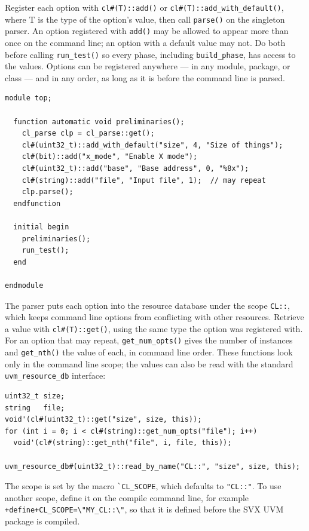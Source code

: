 \documentclass[11pt,letterpaper]{report}
\begin{document}
Register each option with \texttt{cl\#(T)::add()} or \texttt{cl\#(T)::add\_with\_default()}, where T is the type of the option's value, then call \texttt{parse()} on the singleton parser. An option registered with \texttt{add()} may be allowed to appear more than once on the command line; an option with a default value may not. Do both before calling \texttt{run\_test()} so every phase, including \texttt{build\_phase}, has access to the values. Options can be registered anywhere --- in any module, package, or class --- and in any order, as long as it is before the command line is parsed.

\begin{verbatim}
module top;

  function automatic void preliminaries();
    cl_parse clp = cl_parse::get();
    cl#(uint32_t)::add_with_default("size", 4, "Size of things");
    cl#(bit)::add("x_mode", "Enable X mode");
    cl#(uint32_t)::add("base", "Base address", 0, "%8x");
    cl#(string)::add("file", "Input file", 1);  // may repeat
    clp.parse();
  endfunction

  initial begin
    preliminaries();
    run_test();
  end

endmodule
\end{verbatim}

The parser puts each option into the resource database under the scope \texttt{CL::}, which keeps command line options from conflicting with other resources. Retrieve a value with \texttt{cl\#(T)::get()}, using the same type the option was registered with. For an option that may repeat, \texttt{get\_num\_opts()} gives the number of instances and \texttt{get\_nth()} the value of each, in command line order. These functions look only in the command line scope; the values can also be read with the standard \texttt{uvm\_resource\_db} interface:

\begin{verbatim}
uint32_t size;
string   file;
void'(cl#(uint32_t)::get("size", size, this));
for (int i = 0; i < cl#(string)::get_num_opts("file"); i++)
  void'(cl#(string)::get_nth("file", i, file, this));

uvm_resource_db#(uint32_t)::read_by_name("CL::", "size", size, this);
\end{verbatim}

The scope is set by the macro \texttt{\`{}CL\_SCOPE}, which defaults to \texttt{"CL::"}. To use another scope, define it on the compile command line, for example \verb|+define+CL_SCOPE=\"MY_CL::\"|, so that it is defined before the SVX UVM package is compiled.
\end{document}

